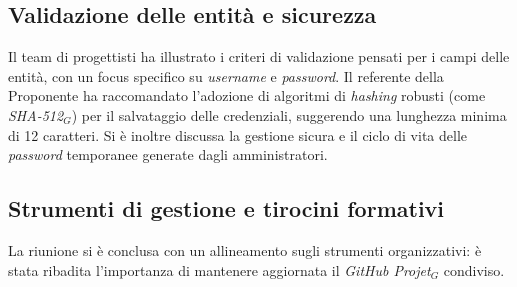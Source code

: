 \documentclass[10pt, letterpaper]{article}
\begin{document}
\subsection*{Validazione delle entità e sicurezza}
Il team di progettisti ha illustrato i criteri di validazione pensati per i campi delle entità, con un focus specifico su \textit{username} e
\textit{password}. Il referente della Proponente ha raccomandato l'adozione di algoritmi di \textit{hashing} robusti
(come \textit{SHA-512$_G$}) per il salvataggio delle credenziali, suggerendo una
lunghezza minima di 12 caratteri. Si è inoltre discussa la gestione sicura e il ciclo di vita delle
\textit{password} temporanee generate dagli amministratori.

\subsection*{Strumenti di gestione e tirocini formativi}
La riunione si è conclusa con un allineamento sugli strumenti organizzativi: è stata ribadita l'importanza di
mantenere aggiornata il \textit{GitHub Projet$_G$} condiviso.

\makeDecisionTable


\makeTodoTable
\end{document}
